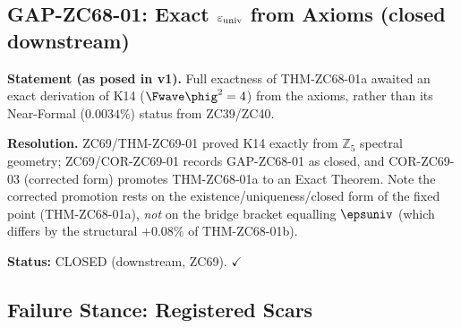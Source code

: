 \documentclass[12pt, a4paper]{article}
\begin{document}
\subsection{GAP-ZC68-01: Exact $\varepsilon_{\rm univ}$ from Axioms
  (closed downstream)}
\label{sec:gap}

\begin{openqbox}[title={GAP-ZC68-01: Exact $\epsuniv$ from Axioms
  --- CLOSED by ZC69}]

\textbf{Statement (as posed in v1).}
Full exactness of THM-ZC68-01a awaited an exact derivation of K14
($\Fwave\phig^2=4$) from the axioms, rather than its Near-Formal
($0.0034\%$) status from ZC39/ZC40.

\textbf{Resolution.}
ZC69/THM-ZC69-01 proved K14 exactly from $\mathbb{Z}_5$ spectral
geometry; ZC69/COR-ZC69-01 records GAP-ZC68-01 as closed, and
COR-ZC69-03 (corrected form) promotes THM-ZC68-01a to an Exact Theorem.
Note the corrected promotion rests on the existence/uniqueness/closed
form of the fixed point (THM-ZC68-01a), \emph{not} on the bridge bracket
equalling $\epsuniv$ (which differs by the structural $+0.08\%$ of
THM-ZC68-01b).

\textbf{Status:} CLOSED (downstream, ZC69). $\checkmark$
\end{openqbox}

\subsection{Failure Stance: Registered Scars}
\label{sec:pm}

\end{document}

